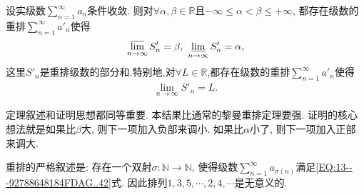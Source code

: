 \documentclass[../../main.tex]{subfiles}%
\begin{document}
\begin{theorem}[Riemann重排定理]\label{theorem:Riemann重排定理}
设实级数$\sum\limits_{n=1}^{\infty}a_n$条件收敛. 则对$\forall \alpha,\beta\in \mathbb{R}$且$-\infty\leqslant\alpha<\beta\leqslant+\infty$, 都存在级数的重排$\sum\limits_{n=1}^{\infty}a'_n$使得
\begin{align}\label{EQ:13---92788648184FDAG..42}
\varlimsup_{n\to\infty}S'_n=\beta,\ \varliminf_{n\to\infty}S'_n=\alpha,
\end{align}
这里$S'_n$是重排级数的部分和.特别地,对$\forall L\in\mathbb{R}$,都存在级数的重排$\sum\limits_{n=1}^{\infty}a'_n$使得
\begin{align*}
\underset{n\rightarrow \infty}{\lim}S'_n=L.
\end{align*}
\end{theorem}
\begin{note}
定理叙述和证明思想都同等重要. 本结果比通常的黎曼重排定理要强. 证明的核心想法就是如果比$\beta$大, 则下一项加入负部来调小. 如果比$\alpha$小了, 则下一项加入正部来调大.
\end{note}
\begin{remark}
重排的严格叙述是: 存在一个双射$\sigma:\mathbb{N}\to\mathbb{N}$, 使得级数$\sum\limits_{n=1}^{\infty}a_{\sigma(n)}$满足\eqref{EQ:13---92788648184FDAG..42}式.
因此排列$1,3,5,\cdots,2,4,\cdots$是无意义的.
\end{remark}
\end{document}
